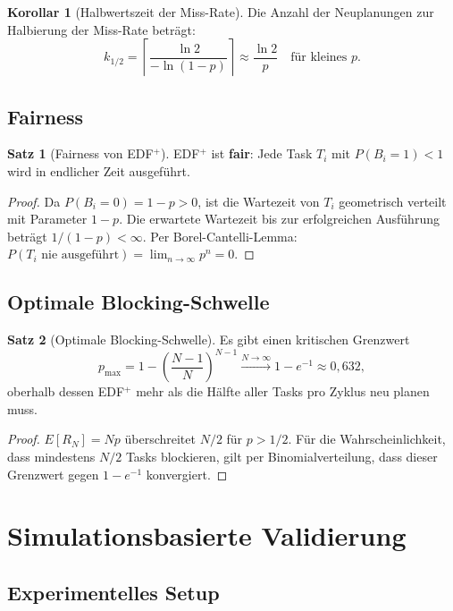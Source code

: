 ﻿\documentclass[a4paper,12pt]{article}
\theoremstyle{definition}
\newtheorem{satz}{Satz}
\newtheorem{korollar}{Korollar}
\begin{document}
	\begin{korollar}[Halbwertszeit der Miss-Rate]
		Die Anzahl der Neuplanungen zur Halbierung der Miss-Rate beträgt:
		\[
		k_{1/2} = \left\lceil \frac{\ln 2}{-\ln(1-p)} \right\rceil \approx \frac{\ln 2}{p}
		\quad \text{für kleines } p.
		\]
	\end{korollar}
	
	\subsection{Fairness}
	
	\begin{satz}[Fairness von EDF$^+$]
		\label{satz:fairness}
		EDF$^+$ ist \textbf{fair}: Jede Task $T_i$ mit $P(B_i = 1) < 1$ wird in
		endlicher Zeit ausgeführt.
	\end{satz}
	
	\begin{proof}
		Da $P(B_i = 0) = 1-p > 0$, ist die Wartezeit von $T_i$ geometrisch verteilt
		mit Parameter $1-p$. Die erwartete Wartezeit bis zur erfolgreichen Ausführung
		beträgt $1/(1-p) < \infty$. Per Borel-Cantelli-Lemma:
		$P(T_i \text{ nie ausgeführt}) = \lim_{n\to\infty} p^n = 0$.
	\end{proof}
	
	\subsection{Optimale Blocking-Schwelle}
	
	\begin{satz}[Optimale Blocking-Schwelle]
		Es gibt einen kritischen Grenzwert
		\[
		p_{\max} = 1 - \left(\frac{N-1}{N}\right)^{N-1} \xrightarrow{N\to\infty} 1 - e^{-1} \approx 0{,}632,
		\]
		oberhalb dessen EDF$^+$ mehr als die Hälfte aller Tasks pro Zyklus neu planen muss.
	\end{satz}
	
	\begin{proof}
		$E[R_N] = Np$ überschreitet $N/2$ für $p > 1/2$. Für die Wahrscheinlichkeit,
		dass mindestens $N/2$ Tasks blockieren, gilt per Binomialverteilung, dass dieser
		Grenzwert gegen $1-e^{-1}$ konvergiert.
	\end{proof}
	
	\section{Simulationsbasierte Validierung}
	
	\subsection{Experimentelles Setup}
	
\end{document}
